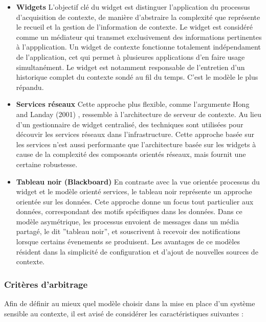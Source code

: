\begin{itemize}
        \item \textbf{Widgets}
		L'objectif clé du widget est distinguer l'application du
		processus d'acquisition de contexte, de manière d'abstraire la
		complexité que représente le recueil et la gestion de
		l'information de contexte. Le widget est considéré comme un
		médiateur qui transmet exclusivement des informations
		pertinentes à l'appplication. Un widget de contexte fonctionne
		totalement indépendament de l'application, cet qui permet à
		plusieures applications d'en faire usage simultanément. Le
		widget est notamment responsable de l'entretien d'un historique
		complet du contexte sondé au fil du temps. C'est le modèle le
		plus répandu.

        \item \textbf{Services réseaux}
		Cette approche plus flexible, comme l'argumente Hong
		and Landay (2001) \cite{hong_infrastructure_2001}, ressemble à
		l'architecture de serveur de contexte. Au lieu d'un
		gestionnaire de widget centralisé, des techniques sont utilisées
		pour découvir les services réseaux dans l'infrastructure. Cette
		approche basée sur les services n'est aussi performante que
		l'architecture basée sur les widgets à cause de la complexité
		des composants orientés réseaux, mais fournit une certaine
		robustesse.

	\item \textbf{Tableau noir (Blackboard)}
                En contraste avec la vue orientée processus du widget et le
		modèle orienté services, le tableau noir représente un approche
		orientée sur les données. Cete approche donne un focus tout
		particulier aux données, correspondant des motifs spécifiques
		dans les données. Dans ce modèle asymétrique, les processus
		envoient de messages dans un média partagé, le dit ''tableau
		noir'', et souscrivent à recevoir des notifications lorsque
		certains évenements se produisent. Les avantages de ce modèles
		résident dans la simplicité de configuration et d'ajout de
		nouvelles sources de contexte.
\end{itemize}

\subsubsection{Critères d'arbitrage}

Afin de définir au mieux quel modèle choisir dans la mise en place d'un système
sensible au contexte, il est avisé de considérer les caractéristiques suivantes
:

